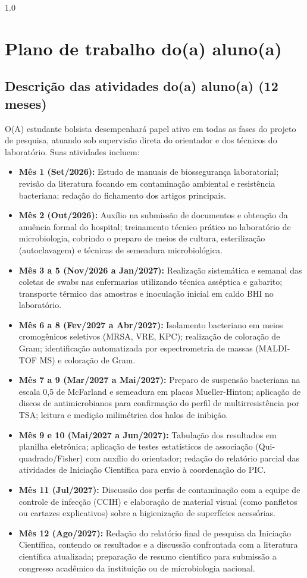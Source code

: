 \documentclass[12pt,a4paper]{article}
\begin{document}
\begin{spacing}{1.0}
\section{Plano de trabalho do(a) aluno(a)}

\subsection{Descrição das atividades do(a) aluno(a) (12 meses)}
O(A) estudante bolsista desempenhará papel ativo em todas as fases do projeto de pesquisa, atuando sob supervisão direta do orientador e dos técnicos do laboratório. Suas atividades incluem:
\begin{itemize}
    \item \textbf{Mês 1 (Set/2026):} Estudo de manuais de biossegurança laboratorial; revisão da literatura focando em contaminação ambiental e resistência bacteriana; redação do fichamento dos artigos principais.
    \item \textbf{Mês 2 (Out/2026):} Auxílio na submissão de documentos e obtenção da anuência formal do hospital; treinamento técnico prático no laboratório de microbiologia, cobrindo o preparo de meios de cultura, esterilização (autoclavagem) e técnicas de semeadura microbiológica.
    \item \textbf{Mês 3 a 5 (Nov/2026 a Jan/2027):} Realização sistemática e semanal das coletas de swabs nas enfermarias utilizando técnica asséptica e gabarito; transporte térmico das amostras e inoculação inicial em caldo BHI no laboratório.
    \item \textbf{Mês 6 a 8 (Fev/2027 a Abr/2027):} Isolamento bacteriano em meios cromogênicos seletivos (MRSA, VRE, KPC); realização de coloração de Gram; identificação automatizada por espectrometria de massas (MALDI-TOF MS) e coloração de Gram.
    \item \textbf{Mês 7 a 9 (Mar/2027 a Mai/2027):} Preparo de suspensão bacteriana na escala 0,5 de McFarland e semeadura em placas Mueller-Hinton; aplicação de discos de antimicrobianos para confirmação do perfil de multirresistência por TSA; leitura e medição milimétrica dos halos de inibição.
    \item \textbf{Mês 9 e 10 (Mai/2027 a Jun/2027):} Tabulação dos resultados em planilha eletrônica; aplicação de testes estatísticos de associação (Qui-quadrado/Fisher) com auxílio do orientador; redação do relatório parcial das atividades de Iniciação Científica para envio à coordenação do PIC.
    \item \textbf{Mês 11 (Jul/2027):} Discussão dos perfis de contaminação com a equipe de controle de infecção (CCIH) e elaboração de material visual (como panfletos ou cartazes explicativos) sobre a higienização de superfícies acessórias.
    \item \textbf{Mês 12 (Ago/2027):} Redação do relatório final de pesquisa da Iniciação Científica, contendo os resultados e a discussão confrontada com a literatura científica atualizada; preparação de resumo científico para submissão a congresso acadêmico da instituição ou de microbiologia nacional.
\end{itemize}


\end{spacing}
\end{document}

